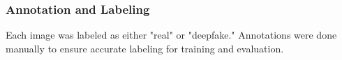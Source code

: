 



\subsubsection{Annotation and Labeling}
Each image was labeled as either "real" or "deepfake." Annotations were done manually to ensure accurate labeling for training and evaluation.